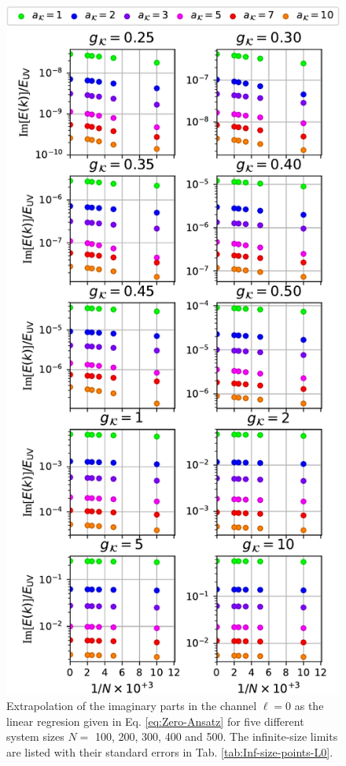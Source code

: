 \documentclass[english,aps,prd,nofootinbib,twocolumn]{revtex4-1}
\begin{document}
\begin{figure}
\centering 
\includegraphics[scale=0.6]{./PlotReport/PlotsSizesL0}
\caption{Extrapolation of the imaginary parts in the channel $\ell=0$ as the linear regresion given in Eq. \eqref{eq:Zero-Ansatz} for five different system sizes $N=$ 100, 200, 300, 400 and 500. The infinite-size limits are listed with their standard errors in Tab. \ref{tab:Inf-size-points-L0}. }
\end{figure}
\end{document}
